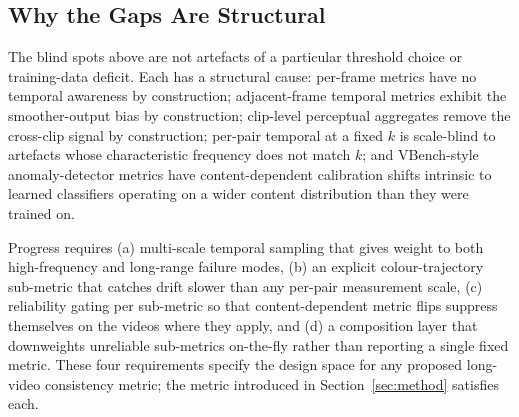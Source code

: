 \subsection{Why the Gaps Are Structural}
\label{sec:problem:structural}

The blind spots above are not artefacts of a particular threshold choice or training-data
deficit. Each has a structural cause: per-frame metrics have no temporal awareness by
construction; adjacent-frame temporal metrics exhibit the smoother-output bias by
construction; clip-level perceptual aggregates remove the cross-clip signal by construction;
per-pair temporal at a fixed $k$ is scale-blind to artefacts whose characteristic frequency
does not match $k$; and VBench-style anomaly-detector metrics have content-dependent
calibration shifts intrinsic to learned classifiers operating on a wider content
distribution than they were trained on.

Progress requires (a) multi-scale temporal sampling that gives weight to both high-frequency
and long-range failure modes, (b) an explicit colour-trajectory sub-metric that catches
drift slower than any per-pair measurement scale, (c) reliability gating per sub-metric so
that content-dependent metric flips suppress themselves on the videos where they apply, and
(d) a composition layer that downweights unreliable sub-metrics on-the-fly rather than
reporting a single fixed metric. These four requirements specify the design space for any
proposed long-video consistency metric; the metric introduced in Section~\ref{sec:method}
satisfies each.

